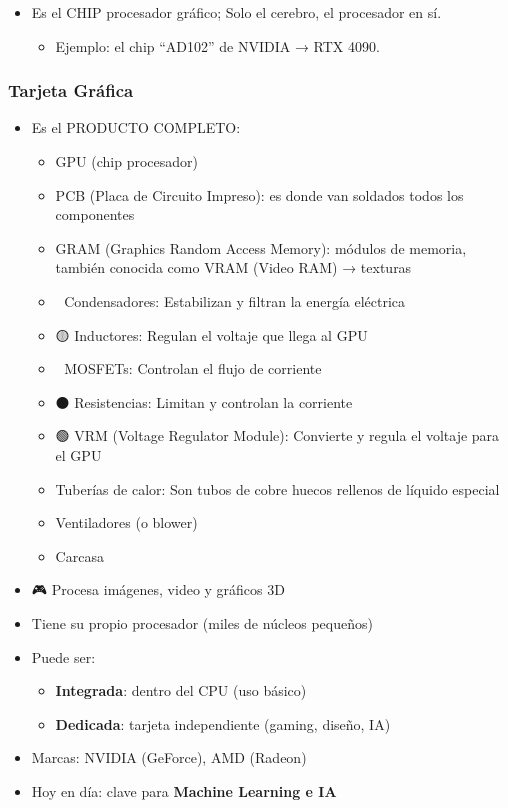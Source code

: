 \documentclass[
  spanish,
  12pt,
  letterpaper,
  DIV=11,
  numbers=noendperiod]{scrreprt}
\providecommand{\tightlist}{%
  \setlength{\itemsep}{0pt}\setlength{\parskip}{0pt}}
\begin{document}
\begin{itemize}
\item
  Es el CHIP procesador gráfico; Solo el cerebro, el procesador en sí.

  \begin{itemize}
  \tightlist
  \item
    Ejemplo: el chip ``AD102'' de NVIDIA → RTX 4090.
  \end{itemize}
\end{itemize}

\subsubsection{Tarjeta Gráfica}\label{tarjeta-gruxe1fica}

\begin{itemize}
\tightlist
\item
  Es el PRODUCTO COMPLETO:

  \begin{itemize}
  \tightlist
  \item
    GPU (chip procesador)
  \item
    PCB (Placa de Circuito Impreso): es donde van soldados todos los
    componentes
  \item
    GRAM (Graphics Random Access Memory): módulos de memoria, también
    conocida como VRAM (Video RAM) → texturas
  \item
    🔵 Condensadores: Estabilizan y filtran la energía eléctrica
  \item
    🟡 Inductores: Regulan el voltaje que llega al GPU
  \item
    🔴 MOSFETs: Controlan el flujo de corriente
  \item
    ⚫ Resistencias: Limitan y controlan la corriente
  \item
    🟢 VRM (Voltage Regulator Module): Convierte y regula el voltaje
    para el GPU
  \item
    Tuberías de calor: Son tubos de cobre huecos rellenos de líquido
    especial
  \item
    Ventiladores (o blower)
  \item
    Carcasa
  \end{itemize}
\item
  🎮 Procesa imágenes, video y gráficos 3D
\item
  Tiene su propio procesador (miles de núcleos pequeños)
\item
  Puede ser:

  \begin{itemize}
  \tightlist
  \item
    \textbf{Integrada}: dentro del CPU (uso básico)
  \item
    \textbf{Dedicada}: tarjeta independiente (gaming, diseño, IA)
  \end{itemize}
\item
  Marcas: NVIDIA (GeForce), AMD (Radeon)
\item
  Hoy en día: clave para \textbf{Machine Learning e IA} 🤖
\end{itemize}
\end{document}
